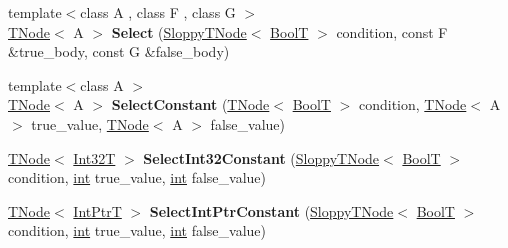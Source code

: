 \begin{DoxyCompactItemize}
\item 
\mbox{\label{classv8_1_1internal_1_1CodeStubAssembler_abf7418e6f236514e2d10b13c8b6f5473}} 
{\footnotesize template$<$class A , class F , class G $>$ }\\\mbox{\hyperlink{classv8_1_1internal_1_1compiler_1_1TNode}{T\+Node}}$<$ A $>$ {\bfseries Select} (\mbox{\hyperlink{classv8_1_1internal_1_1compiler_1_1SloppyTNode}{Sloppy\+T\+Node}}$<$ \mbox{\hyperlink{structv8_1_1internal_1_1BoolT}{BoolT}} $>$ condition, const F \&true\+\_\+body, const G \&false\+\_\+body)
\item 
\mbox{\label{classv8_1_1internal_1_1CodeStubAssembler_ab67257f79281a9c3d3654ffda2a25bfd}} 
{\footnotesize template$<$class A $>$ }\\\mbox{\hyperlink{classv8_1_1internal_1_1compiler_1_1TNode}{T\+Node}}$<$ A $>$ {\bfseries Select\+Constant} (\mbox{\hyperlink{classv8_1_1internal_1_1compiler_1_1TNode}{T\+Node}}$<$ \mbox{\hyperlink{structv8_1_1internal_1_1BoolT}{BoolT}} $>$ condition, \mbox{\hyperlink{classv8_1_1internal_1_1compiler_1_1TNode}{T\+Node}}$<$ A $>$ true\+\_\+value, \mbox{\hyperlink{classv8_1_1internal_1_1compiler_1_1TNode}{T\+Node}}$<$ A $>$ false\+\_\+value)
\item 
\mbox{\label{classv8_1_1internal_1_1CodeStubAssembler_a626a820b4200f6385e2fc0931a355759}} 
\mbox{\hyperlink{classv8_1_1internal_1_1compiler_1_1TNode}{T\+Node}}$<$ \mbox{\hyperlink{structv8_1_1internal_1_1Int32T}{Int32T}} $>$ {\bfseries Select\+Int32\+Constant} (\mbox{\hyperlink{classv8_1_1internal_1_1compiler_1_1SloppyTNode}{Sloppy\+T\+Node}}$<$ \mbox{\hyperlink{structv8_1_1internal_1_1BoolT}{BoolT}} $>$ condition, \mbox{\hyperlink{classint}{int}} true\+\_\+value, \mbox{\hyperlink{classint}{int}} false\+\_\+value)
\item 
\mbox{\label{classv8_1_1internal_1_1CodeStubAssembler_a8ead79c9c2392b0ca05ae6f52479b706}} 
\mbox{\hyperlink{classv8_1_1internal_1_1compiler_1_1TNode}{T\+Node}}$<$ \mbox{\hyperlink{structv8_1_1internal_1_1IntPtrT}{Int\+PtrT}} $>$ {\bfseries Select\+Int\+Ptr\+Constant} (\mbox{\hyperlink{classv8_1_1internal_1_1compiler_1_1SloppyTNode}{Sloppy\+T\+Node}}$<$ \mbox{\hyperlink{structv8_1_1internal_1_1BoolT}{BoolT}} $>$ condition, \mbox{\hyperlink{classint}{int}} true\+\_\+value, \mbox{\hyperlink{classint}{int}} false\+\_\+value)

\end{DoxyCompactItemize}
